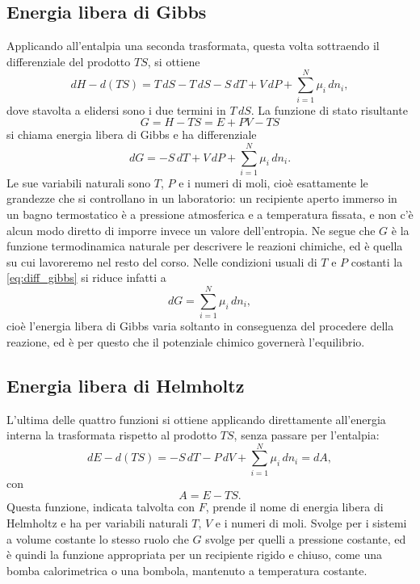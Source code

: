 \subsection{Energia libera di Gibbs}

Applicando all'entalpia una seconda trasformata, questa volta sottraendo il differenziale del prodotto $TS$, si ottiene
\begin{equation}
    dH - d(TS) = T\,dS - T\,dS - S\,dT + V\,dP + \sum_{i=1}^{N}\mu_i\,dn_i ,
    \label{eq:gibbs_passaggio}
\end{equation}
dove stavolta a elidersi sono i due termini in $T\,dS$.
La funzione di stato risultante
\begin{equation}
    G = H - TS = E + PV - TS
    \label{eq:def_gibbs}
\end{equation}
si chiama energia libera di Gibbs e ha differenziale
\begin{equation}
    dG = -S\,dT + V\,dP + \sum_{i=1}^{N}\mu_i\,dn_i .
    \label{eq:diff_gibbs}
\end{equation}
Le sue variabili naturali sono $T$, $P$ e i numeri di moli, cioè esattamente le grandezze che si controllano in un laboratorio: un recipiente aperto immerso in un bagno termostatico è a pressione atmosferica e a temperatura fissata, e non c'è alcun modo diretto di imporre invece un valore dell'entropia.
Ne segue che $G$ è la funzione termodinamica naturale per descrivere le reazioni chimiche, ed è quella su cui lavoreremo nel resto del corso.
Nelle condizioni usuali di $T$ e $P$ costanti la \eqref{eq:diff_gibbs} si riduce infatti a
\begin{equation}
    dG = \sum_{i=1}^{N}\mu_i\,dn_i ,
    \label{eq:gibbs_isotermobarico}
\end{equation}
cioè l'energia libera di Gibbs varia soltanto in conseguenza del procedere della reazione, ed è per questo che il potenziale chimico governerà l'equilibrio.

\newpage

\subsection{Energia libera di Helmholtz}

L'ultima delle quattro funzioni si ottiene applicando direttamente all'energia interna la trasformata rispetto al prodotto $TS$, senza passare per l'entalpia:
\begin{equation}
    dE - d(TS) = -S\,dT - P\,dV + \sum_{i=1}^{N}\mu_i\,dn_i = dA ,
    \label{eq:diff_helmholtz}
\end{equation}
con
\begin{equation}
    A = E - TS .
    \label{eq:def_helmholtz}
\end{equation}
Questa funzione, indicata talvolta con $F$, prende il nome di energia libera di Helmholtz e ha per variabili naturali $T$, $V$ e i numeri di moli.
Svolge per i sistemi a volume costante lo stesso ruolo che $G$ svolge per quelli a pressione costante, ed è quindi la funzione appropriata per un recipiente rigido e chiuso, come una bomba calorimetrica o una bombola, mantenuto a temperatura costante.\\

